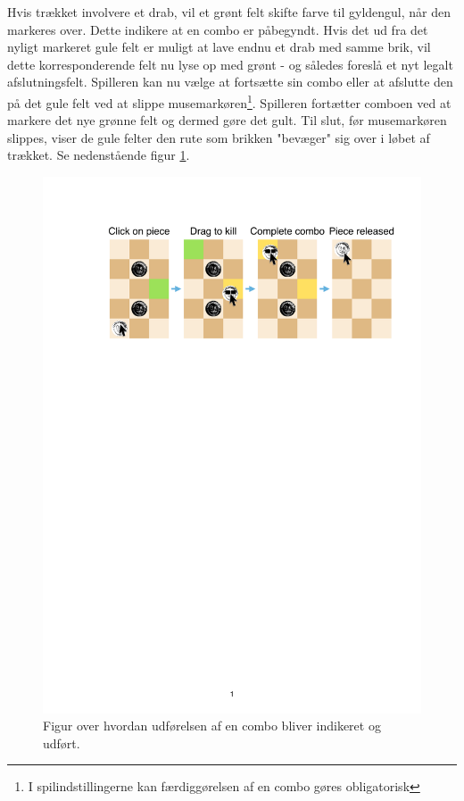 \begin{enumerate}
    Hvis trækket involvere et drab, vil et grønt felt skifte farve til gyldengul, når den markeres over. Dette indikere at en combo er påbegyndt. Hvis det ud fra det nyligt markeret gule felt er muligt at lave endnu et drab med samme brik, vil dette korresponderende felt nu lyse op med grønt - og således foreslå et nyt legalt afslutningsfelt. Spilleren kan nu vælge at fortsætte sin combo eller at afslutte den på det gule felt ved at slippe musemarkøren\footnote{I spilindstillingerne kan færdiggørelsen af en combo gøres obligatorisk}. Spilleren fortætter comboen ved at markere det nye grønne felt og dermed gøre det gult. Til slut, før musemarkøren slippes, viser de gule felter den rute som brikken "bevæger" sig over i løbet af trækket. Se nedenstående figur \ref{fig:ComboFigure}.
     \begin{figure}[H]
        \centering
        \includegraphics[width = \textwidth]{Figurer/ComboFigure}
        \caption{Figur over hvordan udførelsen af en combo bliver indikeret og udført.}
        \label{fig:ComboFigure}
    \end{figure}
\end{enumerate}
  
